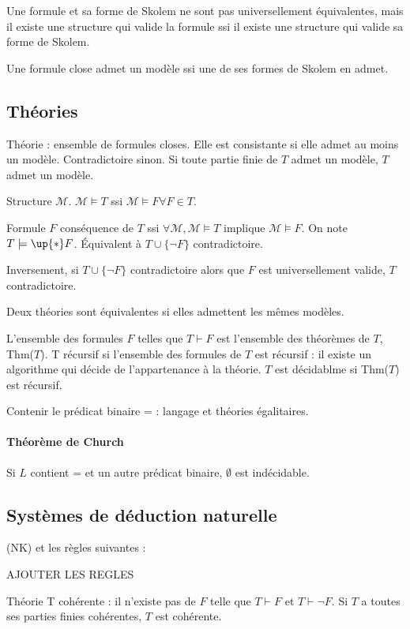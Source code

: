 \documentclass[french]{article}
\begin{document}
Une formule et sa forme de Skolem ne sont pas universellement équivalentes, mais il existe une structure qui valide la formule ssi il existe une structure qui valide sa forme de Skolem.

Une formule close admet un modèle ssi une de ses formes de Skolem en admet.

\subsection{Théories}
Théorie : ensemble de formules closes. Elle est consistante si elle admet au moins un modèle. Contradictoire sinon. Si toute partie finie de $T$ admet un modèle, $T$ admet un modèle.

Structure $\mathcal{M}$. $\mathcal{M}\models T$ ssi $\mathcal{M}\models F\forall F\in T$.

Formule $F$ conséquence de $T$ ssi $\forall\mathcal{M}, \mathcal{M}\models T$ implique $\mathcal{M}\models F$. On note $T\models\up{*} F$. Équivalent à $T\cup\{\neg F\}$ contradictoire.

Inversement, si $T\cup\{\neg F\}$ contradictoire alors que $F$ est universellement valide, $T$ contradictoire.

Deux théories sont équivalentes si elles admettent les mêmes modèles.

L'ensemble des formules $F$ telles que $T\vdash F$ est l'ensemble des théorèmes de $T$, Thm($T$). T récursif si l'ensemble des formules de $T$ est récursif : il existe un algorithme qui décide de l'appartenance à la théorie. $T$ est décidablme si Thm($T$) est récursif.

Contenir le prédicat binaire = : langage et théories égalitaires.

\paragraph{Théorème de Church} Si $L$ contient = et un autre prédicat binaire, $\emptyset$ est indécidable.


\subsection{Systèmes de déduction naturelle}
(NK) et les règles suivantes :

AJOUTER LES REGLES

Théorie T cohérente : il n'existe pas de $F$ telle que $T\vdash F$ et $T\vdash\neg F$. Si $T$ a toutes ses parties finies cohérentes, $T$ est cohérente.
\end{document}
